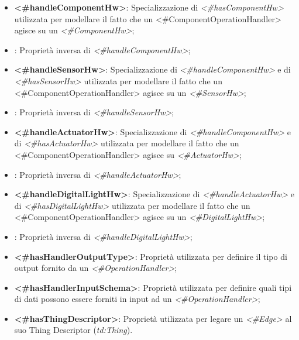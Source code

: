 \begin{itemize}
	\item \textbf{<\#handleComponentHw>}: Specializzazione di \textit{<\#hasComponentHw>} utilizzata per modellare il fatto che un <#ComponentOperationHandler> agisce su un \textit{<\#ComponentHw>};

	\item {}: Proprietà inversa di \textit{<\#handleComponentHw>};

	\item \textbf{<\#handleSensorHw>}: Specializzazione di \textit{<\#handleComponentHw>} e di \textit{<\#hasSensorHw>} utilizzata per modellare il fatto che un <#ComponentOperationHandler> agisce su un \textit{<\#SensorHw>};

	\item {}: Proprietà inversa di \textit{<\#handleSensorHw>};

	\item \textbf{<\#handleActuatorHw>}: Specializzazione di \textit{<\#handleComponentHw>} e di \textit{<\#hasActuatorHw>} utilizzata per modellare il fatto che un <#ComponentOperationHandler> agisce su \textit{<\#ActuatorHw>};

	\item {}: Proprietà inversa di \textit{<\#handleActuatorHw>};

	\item \textbf{<\#handleDigitalLightHw>}: Specializzazione di \textit{<\#handleActuatorHw>} e di \textit{<\#hasDigitalLightHw>} utilizzata per modellare il fatto che un <#ComponentOperationHandler> agisce su un \textit{<\#DigitalLightHw>};

	\item {}: Proprietà inversa di \textit{<\#handleDigitalLightHw>};





	\item \textbf{<\#hasHandlerOutputType>}: Proprietà utilizzata per definire il tipo di output fornito da un \textit{<\#OperationHandler>};

	\item \textbf{<\#hasHandlerInputSchema>}: Proprietà utilizzata per definire quali tipi di dati possono essere forniti in input ad un \textit{<\#OperationHandler>};

	\item \textbf{<\#hasThingDescriptor>}: Proprietà utilizzata per legare un \textit{<\#Edge>} al suo Thing Descriptor (\textit{td:Thing}).
\end{itemize}

